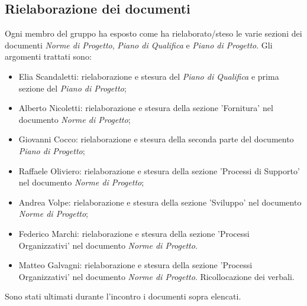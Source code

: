 \documentclass[a4paper, 12pt]{article}
\begin{document}
\subsection{Rielaborazione dei documenti}
Ogni membro del gruppo ha esposto come ha rielaborato/steso le varie sezioni dei documenti \textit{Norme di Progetto}, \textit{Piano di Qualifica} e \textit{Piano di Progetto}. Gli argomenti trattati sono:
\begin{itemize}
	\item Elia Scandaletti: rielaborazione e stesura del \textit{Piano di Qualifica} e prima sezione del \textit{Piano di Progetto};
	\item Alberto Nicoletti: rielaborazione e stesura della sezione 'Fornitura' nel documento \textit{Norme di Progetto};
	\item Giovanni Cocco: rielaborazione e stesura della seconda parte del documento \textit{Piano di Progetto};
	\item Raffaele Oliviero: rielaborazione e stesura della sezione 'Processi di Supporto' nel documento \textit{Norme di Progetto};
	\item Andrea Volpe: rielaborazione e stesura della sezione 'Sviluppo' nel documento \textit{Norme di Progetto};
	\item Federico Marchi: rielaborazione e stesura della sezione 'Processi Organizzativi' nel documento \textit{Norme di Progetto}.
	\item Matteo Galvagni: rielaborazione e stesura della sezione 'Processi Organizzativi' nel documento \textit{Norme di Progetto}. Ricollocazione dei verbali.\\
\end{itemize}
Sono stati ultimati durante l'incontro i documenti sopra elencati.
\end{document}
